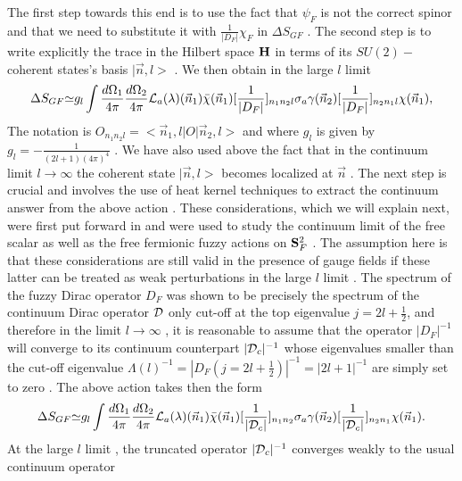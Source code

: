 \documentclass[a4paper,10pt]{article}
\begin{document}
The first step towards this end is to use the fact that ${\psi}_F$ is
not the correct spinor and that we need to substitute it with
$\frac{1}{|{D}_F|}{\chi}_F$ in
${\Delta}{S}_{GF}$ . The
second step is to write explicitly the trace in the Hilbert space
${\bf H}$ in terms of its $SU(2)-$coherent states's basis
$|\vec{n},l>$ . We then obtain in the large $l$ limit
\begin{eqnarray}
{\Delta}{S}_{GF}{\simeq}g_l\int
\frac{d{\Omega}_1}{4{\pi}}\frac{d{\Omega}_2}{4{\pi}}{\cal
L}_a({\lambda})(\vec{n}_1)\bar{\chi}(\vec{n}_1)[\frac{1}{|{D}_F|}]_{n_1n_2l}{\sigma}_a{\gamma}(\vec{n}_2)[\frac{1}{|{D}_F|}]_{n_2n_1l}{\chi}(\vec{n}_1),\label{FG2}\nonumber
\end{eqnarray}
The notation is $O_{n_1n_2l}=<\vec{n}_1,l|O|\vec{n}_2,l>$ and
where $g_l$ is given by $g_l=-\frac{1}{(2l+1)(4{\pi})^4}$ .
We have also used above the fact that in the continuum limit
$l{\longrightarrow}{\infty}$ the coherent state $|\vec{n},l>$
becomes localized at $\vec{n}$ . The next step is crucial and
involves the use of heat kernel techniques to extract the
continuum answer from the above action \cite{denjoe,heat}. These
considerations, which we will explain next, were first put
forward in \cite{denjoe} and were used to study the continuum
limit of the free scalar as well as the free fermionic fuzzy
actions on ${\bf S}^2_F$ . The assumption here is that these
considerations are still valid in the presence of gauge fields
if these latter can be treated as weak perturbations in the
large $l$ limit . The spectrum of the fuzzy Dirac operator
${D}_F$ was shown to be precisely the spectrum of the continuum
Dirac operator ${\cal D}$ only cut-off at the top eigenvalue
$j=2l+\frac{1}{2}$, and therefore in the limit
$l{\longrightarrow}{\infty}$ , it is reasonable to assume that
the operator $|{D}_F|^{-1}$ will converge to its continuum
counterpart $|{\cal D}_{c}|^{-1}$ whose eigenvalues smaller than
the cut-off eigenvalue
${\Lambda}(l)^{-1}=|{D}_F(j=2l+\frac{1}{2})|^{-1}=|2l+1|^{-1}$
are simply set to zero . The above action takes then the form
\begin{eqnarray}
{\Delta}{S}_{GF}{\simeq}g_l\int
\frac{d{\Omega}_1}{4{\pi}}\frac{d{\Omega}_2}{4{\pi}}{\cal
L}_a({\lambda})(\vec{n}_1)\bar{\chi}(\vec{n}_1)[\frac{1}{|{\cal
D}_{c} |}]_{n_1n_2}{\sigma}_a{\gamma}(\vec{n}_2)[\frac{1}{|{\cal
D}_{c}|}]_{n_2n_1}{\chi}(\vec{n}_1).\label{FG3}
\end{eqnarray}
At the large $l$ limit , the truncated operator $|{\cal
D}_{c}|^{-1}$ converges weakly to the usual continuum operator
\end{document}
